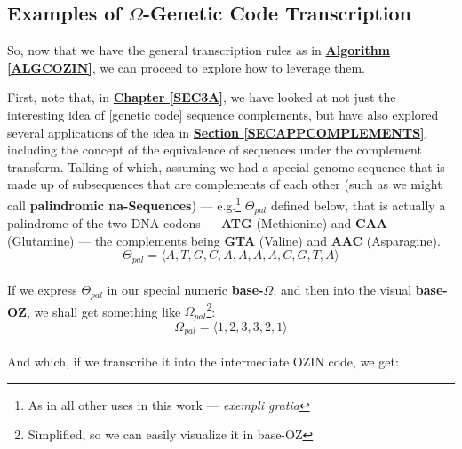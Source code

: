 \documentclass[a4paper, 18pt]{book} %
\begin{document}
\vspace{2em}



\subsection{Examples of $\Omega$-Genetic Code Transcription}
\label{SECEXAMTRANSC}

So, now that we have the general transcription rules as in \textbf{\hyperref[ALGCOZIN]{Algorithm \ref{ALGCOZIN}}}, we can proceed to explore how to leverage them. 

First, note that, in \textbf{\hyperref[SEC3A]{Chapter \ref{SEC3A}}}, we have looked at not just the interesting idea of [genetic code] sequence complements, but have also explored several applications of the idea in \textbf{\hyperref[SECAPPCOMPLEMENTS]{Section \ref{SECAPPCOMPLEMENTS}}}, including the concept of the equivalence of sequences under the complement transform. Talking of which, assuming we had a special genome sequence that is made up of subsequences that are complements of each other (such as we might call \textbf{palindromic na-Sequences}) --- e.g.\footnote{As in all other uses in this work --- \textit{exempli gratia}} $\Theta_{pal}$ defined below, that is actually a palindrome of the two DNA codons --- \textbf{ATG} (Methionine) and \textbf{CAA} (Glutamine) --- the complements being \textbf{GTA} (Valine) and \textbf{AAC} (Asparagine)\cite{wikipedia_codon_tables}.\\

\begin{equation}
\label{GENOMEPAL}
\Theta_{pal} = \langle A, T, G, C, A, A, A, A, C, G, T, A \rangle
\end{equation}\\

If we express $\Theta_{pal}$ in our special numeric \textbf{base-$\Omega$}, and then into the visual \textbf{base-OZ}, we shall get something like $\Omega_{pal}$\footnote{Simplified, so we can easily visualize it in base-OZ}:\\

\begin{equation}
\label{GENOMEPALOMEG}
\Omega_{pal} = \langle 1, 2, 3, 3, 2, 1 \rangle
\end{equation}\\

And which, if we transcribe it into the intermediate OZIN code, we get:
\end{document}
